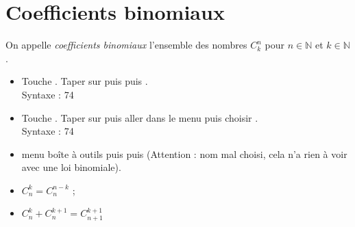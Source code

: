 \documentclass[french]{book}
\newcommand{\C}[2]{C_{#1}^{#2}}
\begin{document}

\section{Coefficients binomiaux}


\begin{defn}
On appelle \emph{coefficients binomiaux} l'ensemble des nombres $\C{k}{n}$ pour $n\in\mathbb{N}$ et $k\in\mathbb{N}$.
\end{defn}

\begin{rem}
\begin{itemize}
\item[Casio : ] Touche . Taper sur  puis  puis .\\
Syntaxe : 74
\item[TI : ] Touche . Taper sur  puis aller dans le menu  puis choisir .\\
Syntaxe : 74
\item[Numworks : ] menu boîte à outils puis  puis  (Attention : nom mal choisi, cela n'a rien à voir avec une loi binomiale).\\

\end{itemize}
\end{rem} 


\begin{prop}
\begin{itemize}
\item[$\bullet$] $\C{n}{k}=\C{n}{n-k}$ ;
\item[$\bullet$] $\C{n}{k}+\C{n}{k+1}=\C{n+1}{k+1}$
\end{itemize}
\end{prop}
\end{document}
